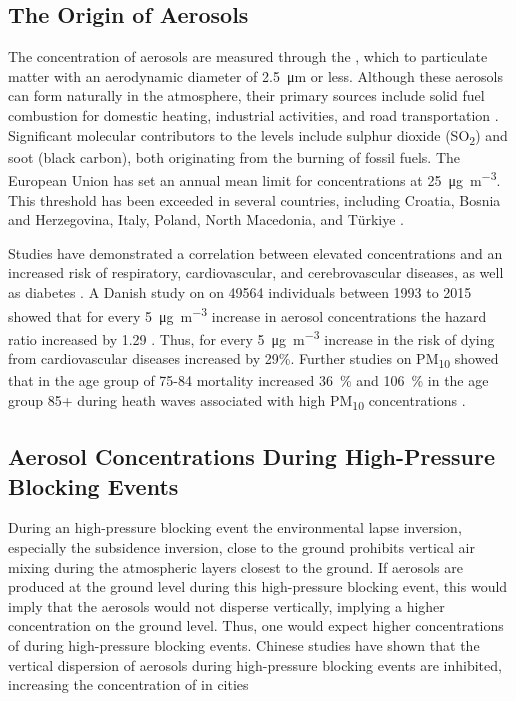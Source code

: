 \subsection{The Origin of Aerosols}
The concentration of aerosols are measured through the \PM, which to particulate matter with an aerodynamic diameter of \SI{2.5}{\micro\meter} or less. Although these aerosols can form naturally in the atmosphere, their primary sources include solid fuel combustion for domestic heating, industrial activities, and road transportation \cite{europeanenvironmentagencyEuropesAirQuality2024}. Significant molecular contributors to the \PM levels include sulphur dioxide (SO\textsubscript{2}) and soot (black carbon), both originating from the burning of fossil fuels. The European Union has set an annual mean limit for \PM  concentrations at \SI{25}{\micro\gram\per\cubic\meter}. This threshold has been exceeded in several countries, including Croatia, Bosnia and Herzegovina, Italy, Poland, North Macedonia, and Türkiye \cite{europeanenvironmentagencyEuropesAirQuality2024}. 

Studies have demonstrated a correlation between elevated \PM concentrations and an increased risk of respiratory, cardiovascular, and cerebrovascular diseases, as well as diabetes \cite{sharmaHealthEffectsAssociated2020}. A Danish study on on \SI{49564}{} individuals between 1993 to 2015 showed that for every \SI{5}{\micro\gram\per
\m\cubed} increase in aerosol concentrations the hazard ratio increased by 1.29 \cite{hvidtfeldtLongtermResidentialExposure2019}. Thus, for every \SI{5}{\micro\gram\per
\m\cubed} increase in \PM the risk of dying from cardiovascular diseases increased by 29\%. Further studies on PM\textsubscript{10} showed that in the age group of 75-84 mortality increased \SI{36}{\%} and \SI{106}{\%} in the age group 85+ during heath waves associated with high PM\textsubscript{10} concentrations \cite{hvidtfeldtLongtermResidentialExposure2019}.  

\subsection{Aerosol Concentrations During High-Pressure Blocking Events}
During an high-pressure blocking event the environmental lapse inversion, especially the subsidence inversion, close to the ground prohibits vertical air mixing during the atmospheric layers closest to the ground. If aerosols are produced at the ground level during this high-pressure blocking event, this would imply that the aerosols would not disperse vertically, implying a higher concentration on the ground level. Thus, one would expect higher concentrations of \PM during high-pressure blocking events. Chinese studies have shown that the vertical dispersion of aerosols during high-pressure blocking events are inhibited, increasing the concentration of \PM in cities \cite{caiImpactBlockingStructure2020}

